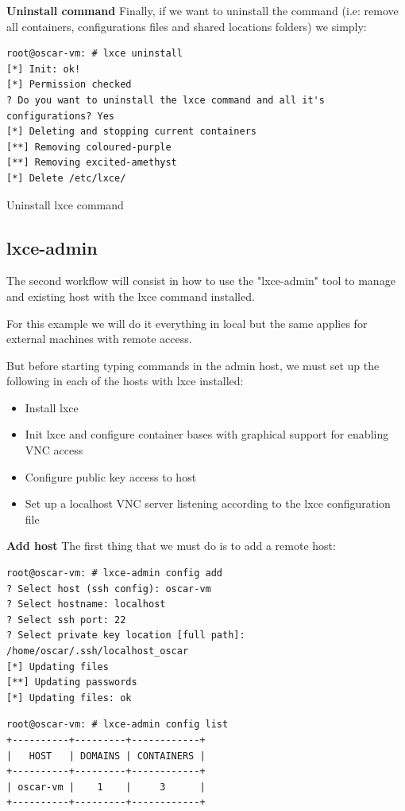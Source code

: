 \textbf{Uninstall command}
Finally, if we want to uninstall the command (i.e: remove all containers, configurations files and shared locations folders) we simply:
\begin{listing}[H]
\begin{verbatim}
root@oscar-vm: # lxce uninstall
[*] Init: ok!
[*] Permission checked
? Do you want to uninstall the lxce command and all it's configurations? Yes
[*] Deleting and stopping current containers
[**] Removing coloured-purple
[**] Removing excited-amethyst
[*] Delete /etc/lxce/
\end{verbatim}
\caption[lxce uninstall]{\footnotesize{Uninstall lxce command}}
\end{listing}


\subsection{lxce-admin}
The second workflow will consist in how to use the "lxce-admin" tool to manage and existing host with the lxce command installed.

For this example we will do it everything in local but the same applies for external machines with remote access.

But before starting typing commands in the admin host, we must set up the following in each of the hosts with lxce installed:
\begin{itemize}
	\item{Install lxce}
	\item{Init lxce and configure container bases with graphical support for enabling VNC access}
	\item{Configure public key access to host}
	\item{Set up a localhost VNC server listening according to the lxce configuration file}
\end{itemize}

\textbf{Add host}
The first thing that we must do is to add a remote host:
\begin{verbatim}
root@oscar-vm: # lxce-admin config add
? Select host (ssh config): oscar-vm
? Select hostname: localhost
? Select ssh port: 22
? Select private key location [full path]: /home/oscar/.ssh/localhost_oscar
[*] Updating files
[**] Updating passwords
[*] Updating files: ok
\end{verbatim}

\begin{verbatim}
root@oscar-vm: # lxce-admin config list
+----------+---------+------------+
|   HOST   | DOMAINS | CONTAINERS |
+----------+---------+------------+
| oscar-vm |    1    |     3      |
+----------+---------+------------+
\end{verbatim}


